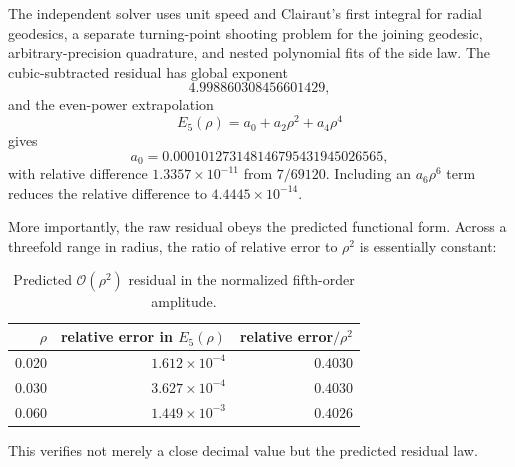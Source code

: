 \documentclass[11pt]{amsart}
\numberwithin{equation}{section}
\theoremstyle{remark}
\newcommand{\bigO}{\mathcal{O}}
\begin{document}
The independent solver uses unit speed and Clairaut's first integral for radial geodesics, a separate turning-point shooting problem for the joining geodesic, arbitrary-precision quadrature, and nested polynomial fits of the side law.  The cubic-subtracted residual has global exponent
\[
 4.998860308456601429,
\]
and the even-power extrapolation
\[
 E_5(\rho)=a_0+a_2\rho^2+a_4\rho^4
\]
gives
\[
 a_0=0.000101273148146795431945026565,
\]
with relative difference $1.3357\times10^{-11}$ from $7/69120$.  Including an $a_6\rho^6$ term reduces the relative difference to $4.4445\times10^{-14}$.

More importantly, the raw residual obeys the predicted functional form.  Across a threefold range in radius, the ratio of relative error to $\rho^2$ is essentially constant:
\begin{table}[htbp]
\centering
\caption{Predicted $\bigO(\rho^2)$ residual in the normalized fifth-order amplitude.}
\label{tab:rho2residual}
\begin{tabular}{rrr}
\toprule
$\rho$ & relative error in $E_5(\rho)$ & relative error$/\rho^2$\\
\midrule
0.020 & $1.612\times10^{-4}$ & $0.4030$\\
0.030 & $3.627\times10^{-4}$ & $0.4030$\\
0.060 & $1.449\times10^{-3}$ & $0.4026$\\
\bottomrule
\end{tabular}
\end{table}
This verifies not merely a close decimal value but the predicted residual law.
\end{document}
